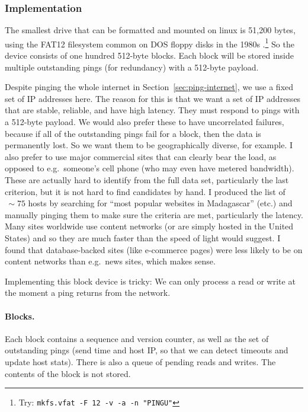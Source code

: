 \documentclass[twocolumn]{article}
\begin{document}
\subsubsection{Implementation}

The smallest drive that can be formatted and mounted on linux is
51,200 bytes, using the FAT12 filesystem common on DOS floppy disks in
the 1980s \cite{wikipediafat12}.\!\footnote{ Try:
  \verb+mkfs.vfat -F 12 -v -a -n "PINGU"+ } So the device consists of
one hundred 512-byte blocks. Each block will be stored inside multiple
outstanding pings (for redundancy) with a 512-byte payload.

Despite pinging the whole internet in Section~\ref{sec:ping-internet},
we use a fixed set of IP addresses here. The reason for this is that
we want a set of IP addresses that are stable, reliable, and have high
latency. They must respond to pings with a 512-byte payload. We would
also prefer these to have uncorrelated failures, because if all of the
outstanding pings fail for a block, then the data is permanently lost.
So we want them to be geographically diverse, for example. I also
prefer to use major commercial sites that can clearly bear the load,
as opposed to e.g.~someone's cell phone (who may even have metered
bandwidth). These are actually hard to identify from the full data
set, particularly the last criterion, but it is not hard to find
candidates by hand. I produced the list of $\,\sim\!75$ hosts by searching for
``most popular websites in Madagascar'' (etc.) and manually pinging
them to make sure the criteria are met, particularly the latency. Many
sites worldwide use content networks (or are simply hosted in the
United States) and so they are much faster than the speed of light
would suggest. I found that database-backed sites (like e-commerce
pages) were less likely to be on content networks than e.g.~news
sites, which makes sense.


Implementing this block device is tricky: We can only process a read
or write at the moment a ping returns from the network.

\paragraph{Blocks.} Each block contains a sequence and version counter,
as well as the set of outstanding pings (send time and host IP, so that
we can detect timeouts and update host stats). There is also a queue
of pending reads and writes. The contents of the block is not stored.
\end{document}
